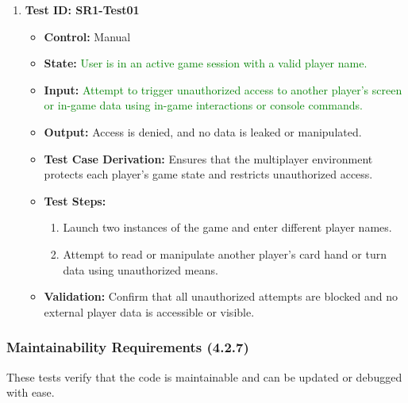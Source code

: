 \documentclass[12pt]{article}
\newcommand{\added}[1]{\textcolor{green}{#1}}
\begin{document}
\begin{enumerate}
    \item \textbf{Test ID: SR1-Test01}
    \begin{itemize}
        \item \textbf{Control:} Manual
        \item \textbf{State:} \added{User is in an active game session with a valid player name.}
        \item \textbf{Input:} \added{Attempt to trigger unauthorized access to another player’s screen or in-game data using in-game interactions or console commands.}
        \item \textbf{Output:} Access is denied, and no data is leaked or manipulated.
        \item \textbf{Test Case Derivation:} Ensures that the multiplayer environment protects each player’s game state and restricts unauthorized access.
        \item \textbf{Test Steps:}
        \begin{enumerate}
            \item Launch two instances of the game and enter different player names.
            \item Attempt to read or manipulate another player’s card hand or turn data using unauthorized means.
        \end{enumerate}
        \item \textbf{Validation:} Confirm that all unauthorized attempts are blocked and no external player data is accessible or visible.
    \end{itemize}
\end{enumerate}

\subsubsection{Maintainability Requirements (4.2.7)}

These tests verify that the code is maintainable and can be updated or debugged with ease.
\end{document}
